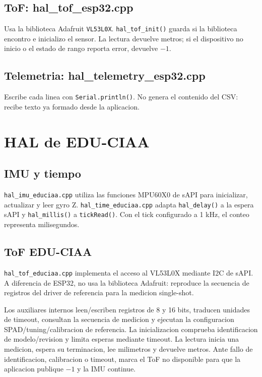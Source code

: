 \documentclass[11pt,a4paper]{article}
\begin{document}
\subsection{ToF: hal\_tof\_esp32.cpp}

Usa la biblioteca Adafruit \texttt{VL53L0X}. \texttt{hal\_tof\_init()} guarda
si la biblioteca encontro e inicializo el sensor. La lectura devuelve metros;
si el dispositivo no inicio o el estado de rango reporta error, devuelve $-1$.

\subsection{Telemetria: hal\_telemetry\_esp32.cpp}

Escribe cada linea con \texttt{Serial.println()}. No genera el contenido del
CSV: recibe texto ya formado desde la aplicacion.

\section{HAL de EDU-CIAA}

\subsection{IMU y tiempo}

\texttt{hal\_imu\_educiaa.cpp} utiliza las funciones MPU60X0 de sAPI para
inicializar, actualizar y leer gyro Z. \texttt{hal\_time\_educiaa.cpp} adapta
\texttt{hal\_delay()} a la espera sAPI y \texttt{hal\_millis()} a
\texttt{tickRead()}. Con el tick configurado a 1 kHz, el conteo representa
milisegundos.

\subsection{ToF EDU-CIAA}

\texttt{hal\_tof\_educiaa.cpp} implementa el acceso al VL53L0X mediante I2C de
sAPI. A diferencia de ESP32, no usa la biblioteca Adafruit: reproduce la
secuencia de registros del driver de referencia para la medicion single-shot.

Los auxiliares internos leen/escriben registros de 8 y 16 bits, traducen
unidades de timeout, consultan la secuencia de medicion y ejecutan la
configuracion SPAD/tuning/calibracion de referencia. La inicializacion comprueba
identificacion de modelo/revision y limita esperas mediante timeout. La lectura
inicia una medicion, espera su terminacion, lee milimetros y devuelve metros.
Ante fallo de identificacion, calibracion o timeout, marca el ToF no disponible
para que la aplicacion publique $-1$ y la IMU continue.
\end{document}
